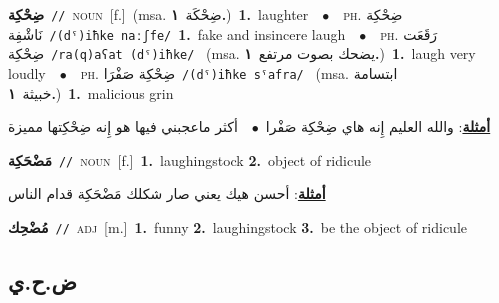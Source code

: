 \documentclass[10pt,a4paper,twoside]{article} %
\begin{document}
\begin{multicols}{2}
{\setlength\topsep{0pt}\textbf{\foreignlanguage{arabic}{ضِحْكِة}}\ {\color{gray}\texttt{//}\color{black}}\ \textsc{noun}\ [f.]\ \color{gray}(msa. \foreignlanguage{arabic}{ضِحْكَة}~\foreignlanguage{arabic}{\textbf{١.}})\color{black}\ \textbf{1.}~laughter\ \ $\bullet$\ \ \textsc{ph.} \color{gray} \foreignlanguage{arabic}{ضِحْكِة نَاشْفِة}\color{black}\ {\color{gray}\texttt{/{\sffamily (dˤ)iħke naːʃfe}/}\color{black}}\ \textbf{1.}~fake and insincere laugh\ \ $\bullet$\ \ \textsc{ph.} \color{gray} \foreignlanguage{arabic}{رَقَعَت ضِحْكِة}\color{black}\ {\color{gray}\texttt{/{\sffamily ra(q)aʕat (dˤ)iħke}/}\color{black}}\ \color{gray} (msa. \foreignlanguage{arabic}{يضحك بصوت مرتفع}~\foreignlanguage{arabic}{\textbf{١.}})\color{black}\ \textbf{1.}~laugh very loudly\ \ $\bullet$\ \ \textsc{ph.} \color{gray} \foreignlanguage{arabic}{ضِحْكِة صَفْرَا}\color{black}\ {\color{gray}\texttt{/{\sffamily (dˤ)iħke sˤafra}/}\color{black}}\ \color{gray} (msa. \foreignlanguage{arabic}{ابتسامة خبيثة}~\foreignlanguage{arabic}{\textbf{١.}})\color{black}\ \textbf{1.}~malicious grin\  \begin{flushright}\color{gray}\foreignlanguage{arabic}{\textbf{\underline{\foreignlanguage{arabic}{أمثلة}}}: والله العليم إِنه هاي ضِحْكِة صَفْرا\ $\bullet$\ \  أكثر ماعجبني فيها هو إِنه ضِحْكِتها مميزة}\end{flushright}\color{black}} \vspace{2mm}

{\setlength\topsep{0pt}\textbf{\foreignlanguage{arabic}{مَضْحَكِة}}\ {\color{gray}\texttt{//}\color{black}}\ \textsc{noun}\ [f.]\ \textbf{1.}~laughingstock  \textbf{2.}~object of ridicule\  \begin{flushright}\color{gray}\foreignlanguage{arabic}{\textbf{\underline{\foreignlanguage{arabic}{أمثلة}}}: أحسن هيك يعني صار شكلك مَضْحَكِة قدام الناس}\end{flushright}\color{black}} \vspace{2mm}

{\setlength\topsep{0pt}\textbf{\foreignlanguage{arabic}{مُضْحِك}}\ {\color{gray}\texttt{//}\color{black}}\ \textsc{adj}\ [m.]\ \textbf{1.}~funny  \textbf{2.}~laughingstock  \textbf{3.}~be the object of ridicule\ } \vspace{2mm}

\vspace{-3mm}
\subsection*{\color{blue}\foreignlanguage{arabic}{ض.ح.ي}\color{blue}{}} 


\end{multicols}
\end{document}
